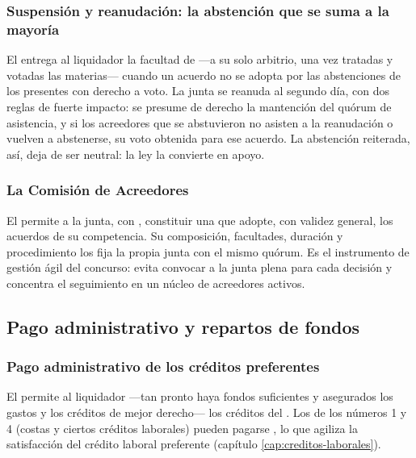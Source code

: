 \subsubsection{Suspensión y reanudación: la abstención que se suma a la mayoría}

El  entrega al liquidador la facultad de  ---a su solo
arbitrio, una vez tratadas y votadas las materias--- cuando un acuerdo no se adopta por las
abstenciones de los presentes con derecho a voto. La junta se reanuda al segundo día, con dos
reglas de fuerte impacto: se presume de derecho la mantención del quórum de asistencia, y si los
acreedores que se abstuvieron no asisten a la reanudación o vuelven a abstenerse, su voto
 obtenida para ese acuerdo. La abstención
reiterada, así, deja de ser neutral: la ley la convierte en apoyo.

\subsubsection{La Comisión de Acreedores}

El  permite a la junta, con , constituir una
 que adopte, con validez general, los acuerdos de su competencia.
Su composición, facultades, duración y procedimiento los fija la propia junta con el mismo quórum.
Es el instrumento de gestión ágil del concurso: evita convocar a la junta plena para cada decisión
y concentra el seguimiento en un núcleo de acreedores activos.

\subsection{Pago administrativo y repartos de fondos}

\subsubsection{Pago administrativo de los créditos preferentes}

El  permite al liquidador  ---tan pronto haya
fondos suficientes y asegurados los gastos y los créditos de mejor derecho--- los créditos del
. Los de los números 1 y 4 (costas y ciertos créditos laborales) pueden pagarse
, lo que agiliza la satisfacción del crédito laboral
preferente (capítulo \ref{cap:creditos-laborales}).

